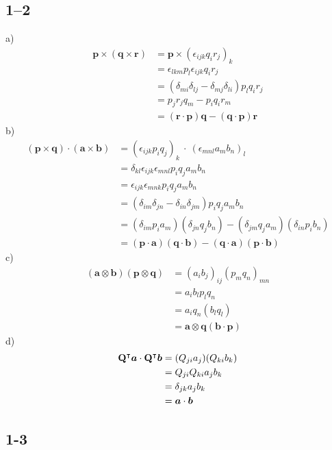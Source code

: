 \subsection*{1--2}
a)
\begin{align*}
\bm{p} \times (\bm{q} \times \bm{r}) &= \bm{p} \times(\epsilon_{ijk}q_{i}r_{j})_k \\
  &= \epsilon_{lkm}p_{l}\epsilon_{ijk}q_i r_j \\
  &=(\delta_{mi}\delta_{lj}-\delta_{mj}\delta_{li})p_l q_i r_j \\
  &= p_j r_j q_m - p_i q_i r_m \\
  &= (\bm{r} \cdot \bm{p}) \bm{q} - (\bm{q} \cdot \bm{p}) \bm{r}
\end{align*}
b)\ 
\begin{align*}
    (\bm{p} \times \bm{q}) \cdot (\bm{a} \times \bm{b}) &= (\epsilon_{ijk}p_i q_j)_k \ \cdot\ (\epsilon_{mnl}a_m b_n)_l \\
    &= \delta_{kl}\epsilon_{ijk}\epsilon_{mnl}p_i q_ja_m b_n \\ 
    &= \epsilon_{ijk}\epsilon_{mnk}p_i q_ja_m b_n \\
    &= (\delta_{im}\delta_{jn}-\delta_{in}\delta_{jm})p_i q_ja_m b_n \\
    &= (\delta_{im}p_i a_m)(\delta_{jn}q_j b_n) - (\delta_{jm}q_j a_m)(\delta_{in}p_i b_n) \\
    &= (\bm{p} \cdot \bm{a}) (\bm{q} \cdot \bm{b}) - (\bm{q} \cdot \bm{a})(\bm{p} \cdot \bm{b})
\end{align*}
c)
\begin{align*}
    (\bm{a} \otimes \bm{b})(\bm{p} \otimes \bm{q}) &= (a_i b_j)_{ij} (p_m q_n)_{mn} \\
    &= a_ib_lp_lq_n \\
    &= a_iq_n (b_l q_l) \\
    &= \bm{a}\otimes\bm{q}(\bm{b} \cdot \bm{p})
\end{align*}
d)  
\begin{align*}
    \mathbf{Q}^\intercal\bm{a} \cdot \mathbf{Q}^\intercal\bm{b} &= (Q_{ji}a_j) (Q_{ki}b_k) \\
    &= Q_{ji}Q_{ki}a_j b_k \\
    &= \delta_{jk}a_j b_k \\
    &= \bm{a}\cdot\bm{b}
\end{align*}

\subsection*{1-3}

